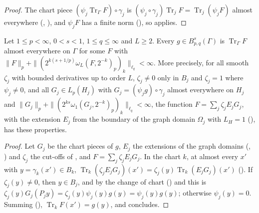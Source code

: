 \begin{proof}
\leanok
The chart piece $(\psi_j \operatorname{Tr}_\Gamma F) \circ \gamma_j$ is
$(\psi_j \circ \gamma_j) \operatorname{Tr}_j F = \operatorname{Tr}_j (\psi_j F)$ almost everywhere
(, ), and $\psi_j F$ has a finite norm
(), so  applies.
\end{proof}

\begin{theorem}
\label{thm:boundary-trace-extension}
\leanok
{}
Let $1 \leq p < \infty$, $0 < s < 1$, $1 \leq q \leq \infty$ and $L \geq 2$. Every
$g \in B^s_{p,q}(\Gamma)$ is $\operatorname{Tr}_\Gamma F$ almost everywhere on $\Gamma$ for some $F$
with $\|F\|_p + \|(2^{k(s + 1/p)} \omega_L(F, 2^{-k})_p)_k\|_{\ell_q} < \infty$. More precisely,
for all smooth $\zeta_j$ with bounded derivatives up to order $L$, $\zeta_j \neq 0$ only in $B_j$
and $\zeta_j = 1$ where $\psi_j \neq 0$, and all $G_j \in L_p(H_j)$ with
$G_j = (\psi_j g) \circ \gamma_j$ almost everywhere on $H_j$ and
$\|G_j\|_p + \|(2^{ks} \omega_1(G_j, 2^{-k})_p)_k\|_{\ell_q} < \infty$, the function
$F = \sum_j \zeta_j E_j G_j$, with the extension $E_j$ from the boundary of the graph domain
$\Omega_j$ with $L_H = 1$ (), has these properties.
\end{theorem}

\begin{proof}
\leanok
Let $G_j$ be the chart pieces of $g$, $E_j$ the extensions of the graph domains
(, ) and $\zeta_j$ the cut-offs of
, and $F = \sum_j \zeta_j E_j G_j$. In the chart $k$, at almost every
$x'$ with $y = \gamma_k(x') \in B_k$,
$\operatorname{Tr}_k(\zeta_j E_j G_j)(x') = \zeta_j(y) \operatorname{Tr}_k(E_j G_j)(x')$
(). If $\zeta_j(y) \neq 0$, then $y \in B_j$, and by the change of chart
() and  this is
$\zeta_j(y) G_j(P_j y) = \zeta_j(y) \psi_j(y) g(y) = \psi_j(y) g(y)$; otherwise $\psi_j(y) = 0$.
Summing (), $\operatorname{Tr}_k F(x') = g(y)$, and
 concludes.
\end{proof}

